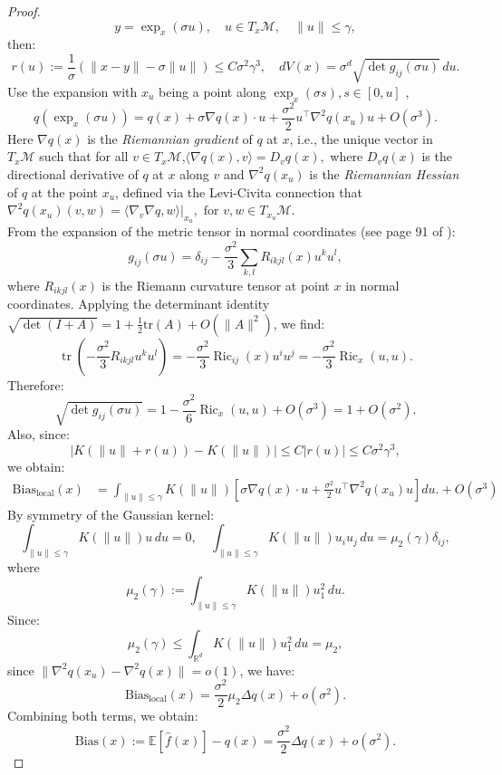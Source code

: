 \documentclass{article}
\begin{document}
\begin{proof}
\[
y = \exp_x(\sigma u),\quad u \in T_x \mathcal{M}, \quad \|u\| \le \gamma,
\]
then:
\[
r(u):=\frac{1}{\sigma}(\|x-y\| -\sigma \|u\|)\leq C\sigma^2\gamma^3, \quad  dV(x) = \sigma^d \sqrt{\det g_{ij}(\sigma u)} \, du.
\]
Use the expansion with $x_u$ being a point along $\exp_x(\sigma s), s\in [0,u]$ \cite{Boumal_2023},
\[
q(\exp_x(\sigma u)) = q(x) + \sigma \nabla q(x) \cdot u + \frac{\sigma^2}{2} u^\top \nabla^2 q(x_u) u + O(\sigma^3).
\]
Here \( \nabla q(x) \) is the \emph{Riemannian gradient} of \( q \) at \( x \), i.e., the unique vector in \( T_x\mathcal{M} \) such that for all \( v \in T_x\mathcal{M} \),\(\langle \nabla q(x), v \rangle = D_v q(x),\) where \( D_v q(x) \) is the directional derivative of \( q \) at \( x \) along \( v \) and \( \nabla^2 q(x_u) \) is the \emph{Riemannian Hessian} of \( q \) at the point \( x_u \), defined via the Levi-Civita connection that
    \(
    \nabla^2 q(x_u)(v, w) = \langle \nabla_v \nabla q, w \rangle \big|_{x_u},\text{ for } v, w \in T_{x_u}\mathcal{M}.
    \)\\
From the expansion of the metric tensor in normal coordinates (see page 91 of \cite{Chavel_2006}):
\[
g_{ij}(\sigma u) = \delta_{ij} - \frac{\sigma^2}{3} \sum_{k,l} R_{ikjl}(x) u^k u^l,
\]
where \( R_{ikjl}(x) \) is the Riemann curvature tensor at point \( x \) in normal coordinates.
Applying the determinant identity \( \sqrt{\det(I + A)} = 1 + \frac{1}{2} \text{tr}(A) + O(\|A\|^2) \), we find:
\[
\operatorname{tr}\left( -\frac{\sigma^2}{3} R_{ikjl} u^k u^l \right) = -\frac{\sigma^2}{3} \operatorname{Ric}_{ij}(x) u^i u^j = -\frac{\sigma^2}{3} \operatorname{Ric}_{x}(u, u).
\]
Therefore:
\[
\sqrt{\det g_{ij}(\sigma u)} = 1 - \frac{\sigma^2}{6} \operatorname{Ric}_x(u, u) + O(\sigma^3) = 1 + O(\sigma^2).
\]
Also, since:
\[
|K(\|u\|+r(u))-K(\|u\|)|\leq C |r(u)|\leq C\sigma^2\gamma^3,
\]
we obtain:
\[
\begin{aligned}
\text{Bias}_{\text{local}}(x)
&= \int_{\|u\| \le \gamma} K(\|u\|) \left[ \sigma \nabla q(x) \cdot u + \frac{\sigma^2}{2} u^\top \nabla^2 q(x_u) u \right] du. + O(\sigma^3)
\end{aligned}
\]
By symmetry of the Gaussian kernel:
\[
\int_{\|u\| \le \gamma} K(\|u\|) u \, du = 0, \quad \int_{\|u\| \le \gamma} K(\|u\|) u_i u_j \, du = \mu_2(\gamma) \delta_{ij},
\]
where
\[
\mu_2(\gamma) := \int_{\|u\| \le \gamma} K(\|u\|) u_1^2 \, du.
\]
Since:
\[
\mu_2(\gamma) \le \int_{\mathbb{R}^d} K(\|u\|) u_1^2 \, du = \mu_2,
\]
since $\|\nabla^2 q(x_u)-\nabla^2 q(x)\|=o(1)$, we have:
\[
\text{Bias}_{\text{local}}(x) = \frac{\sigma^2}{2} \mu_2 \Delta q(x) + o(\sigma^2).
\]
Combining both terms, we obtain:
\[
\text{Bias}(x) := \mathbb{E}[\hat{f}(x)] - q(x)
= \frac{\sigma^2}{2} \Delta q(x) + o(\sigma^2 ).
\]
\end{proof}
\end{document}
